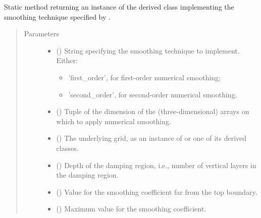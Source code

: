 \documentclass[letterpaper,10pt,english]{sphinxmanual}
\begin{document}
\begin{fulllineitems}
\begin{fulllineitems}
\label{\detokenize{api:dycore.horizontal_smoothing.HorizontalSmoothing.factory}}
Static method returning an instance of the derived class implementing the smoothing technique
specified by .
\begin{quote}\begin{description}
\item[{Parameters}] \leavevmode\begin{itemize}
\item {} 
 () \textendash{} 
String specifying the smoothing technique to implement. Either:
\begin{itemize}
\item {} 
’first\_order’, for first-order numerical smoothing;

\item {} 
’second\_order’, for second-order numerical smoothing.

\end{itemize}


\item {} 
 () \textendash{} Tuple of the dimension of the (three-dimensional) arrays on which to apply numerical smoothing.

\item {} 
 () \textendash{} The underlying grid, as an instance of {\hyperref[\detokenize{api:grids.grid_xyz.GridXYZ}]{}} or one of its derived classes.

\item {} 
 () \textendash{} Depth of the damping region, i.e., number of vertical layers in the damping region.

\item {} 
 () \textendash{} Value for the smoothing coefficient far from the top boundary.

\item {} 
 () \textendash{} Maximum value for the smoothing coefficient.


\end{itemize}
\end{description}
\end{quote}
\end{fulllineitems}
\end{fulllineitems}
\end{document}

